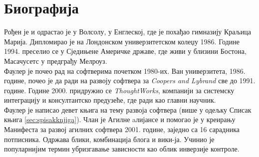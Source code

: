 \documentclass[12pt,a4paper]{article}
\begin{document}
\section{{Биографија}}
\label{sec:biografija}
Рођен је и одрастао је у Волсолу, у Енглеској, где је похађао гимназију Краљица Марија. Дипломирао је на Лондонском универзитетском колеџу 1986. Године 1994. преселио се у Сједињене Америчке државе, где живи у близини Бостона, Масачусетс у предграђу Мелроуз\cite{sajt}.\\
Фаулер је почео рад на софтверима почетком 1980-их. Ван универзитета, 1986. године, почео је да ради на развоју софтвера за \emph{Coopers and Lybrand} све до 1991.\cite{k_3} године. Године 2000. придружио се \emph{ThoughtWorks}, компанији за системску интеграцију и консултантско предузеће\cite{sajt}, где ради као главни научник.\cite{sajt_2}\\
Фаулер је написао девет књига на тему развоја софтвера (више у одељку Списак књига \ref{sec:spisakknjiga}). Члан је Агилне aлијансе и помогао је у креирању Манифеста за развој агилних софтвера 2001. године, заједно са 16 сарадника потписника.\cite{sajt_3} Одржава блики, комбинација блога и вики-ја. Учинио је популарнијим термин убризгавање зависности као облик инверзије контроле. \cite{sajt_4, knjiga}


\newpage
\end{document}
